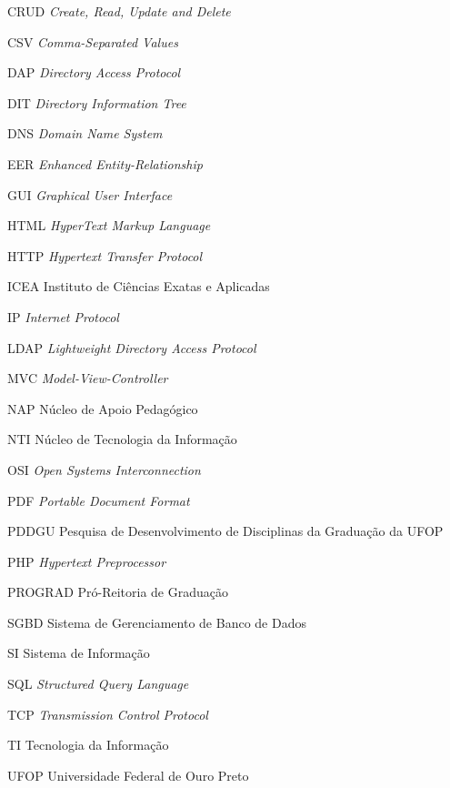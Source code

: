 \documentclass[
  12pt,       %
  openright,      %
  oneside,      %
  a4paper,      %
  english,      %
  french,        %
  spanish,     %
  brazil        %
  ]{abntex2-decsi}
\begin{document}
\begin{siglas}
  \item[CRUD] \textit{Create, Read, Update and Delete}
  \item[CSV] \textit{Comma-Separated Values}
  \item[DAP] \textit{Directory Access Protocol}
  \item[DIT] \textit{Directory Information Tree}
  \item[DNS] \textit{Domain Name System}
  \item[EER] \textit{Enhanced Entity-Relationship}
  \item[GUI] \textit{Graphical User Interface}
  \item[HTML] \textit{HyperText Markup Language}
  \item[HTTP] \textit{Hypertext Transfer Protocol}
  \item[ICEA] Instituto de Ciências Exatas e Aplicadas
  \item[IP] \textit{Internet Protocol}
  \item[LDAP] \textit{Lightweight Directory Access Protocol}
  \item[MVC] \textit{Model-View-Controller}
  \item[NAP] Núcleo de Apoio Pedagógico
  \item[NTI] Núcleo de Tecnologia da Informação
  \item[OSI] \textit{Open Systems Interconnection}
  \item[PDF] \textit{Portable Document Format}
  \item[PDDGU] Pesquisa de Desenvolvimento de Disciplinas da Graduação da UFOP
  \item[PHP] \textit{Hypertext Preprocessor}
  \item[PROGRAD] Pró-Reitoria de Graduação
  \item[SGBD] Sistema de Gerenciamento de Banco de Dados
  \item[SI] Sistema de Informação
  \item[SQL] \textit{Structured Query Language}
  \item[TCP] \textit{Transmission Control Protocol}
  \item[TI] Tecnologia da Informação
  \item[UFOP] Universidade Federal de Ouro Preto
\end{siglas}

\end{document}
